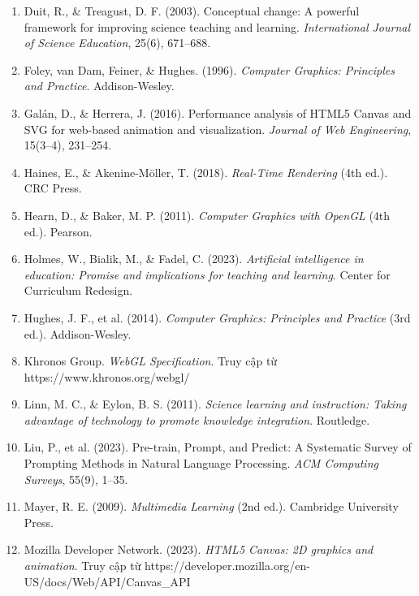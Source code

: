 \begin{enumerate}
\item Duit, R., \& Treagust, D. F. (2003). Conceptual change: A powerful framework for improving science teaching and learning. \textit{International Journal of Science Education}, 25(6), 671–688.

\item Foley, van Dam, Feiner, \& Hughes. (1996). \textit{Computer Graphics: Principles and Practice}. Addison-Wesley.

\item Galán, D., \& Herrera, J. (2016). Performance analysis of HTML5 Canvas and SVG for web-based animation and visualization. \textit{Journal of Web Engineering}, 15(3–4), 231–254.

\item Haines, E., \& Akenine-Möller, T. (2018). \textit{Real-Time Rendering} (4th ed.). CRC Press.

\item Hearn, D., \& Baker, M. P. (2011). \textit{Computer Graphics with OpenGL} (4th ed.). Pearson.

\item Holmes, W., Bialik, M., \& Fadel, C. (2023). \textit{Artificial intelligence in education: Promise and implications for teaching and learning}. Center for Curriculum Redesign.

\item Hughes, J. F., et al. (2014). \textit{Computer Graphics: Principles and Practice} (3rd ed.). Addison-Wesley.

\item Khronos Group. \textit{WebGL Specification}. Truy cập từ https://www.khronos.org/webgl/

\item Linn, M. C., \& Eylon, B. S. (2011). \textit{Science learning and instruction: Taking advantage of technology to promote knowledge integration}. Routledge.

\item Liu, P., et al. (2023). Pre-train, Prompt, and Predict: A Systematic Survey of Prompting Methods in Natural Language Processing. \textit{ACM Computing Surveys}, 55(9), 1–35.

\item Mayer, R. E. (2009). \textit{Multimedia Learning} (2nd ed.). Cambridge University Press.

\item Mozilla Developer Network. (2023). \textit{HTML5 Canvas: 2D graphics and animation}. Truy cập từ https://developer.mozilla.org/en-US/docs/Web/API/Canvas\_API


\end{enumerate}
